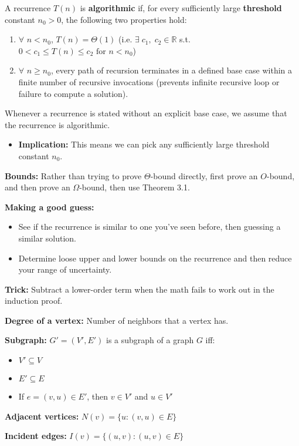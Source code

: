 A recurrence $T(n)$ is \textbf{algorithmic} if, for every sufficiently large \textbf{threshold} constant $n_0 >0$, the following two properties hold:
\begin{enumerate}
    \item $\forall$ $n<n_0$, $T(n) = \Theta(1)$ (i.e. $\exists \; c_1, \; c_2 \in \mathbb{R}$ s.t. $0<c_1\leq T(n) \leq c_2 \text{ for } n<n_0$)
    \item $\forall$ $n \geq n_0$, every path of recursion terminates in a defined base case within a finite number of recursive invocations (prevents infinite recursive loop or failure to compute a solution).
\end{enumerate}

\begin{intuition}
    Whenever a recurrence is stated without an explicit base case, we assume that the recurrence is algorithmic.
    \begin{itemize}
        \item \textbf{Implication:} This means we can pick any sufficiently large threshold constant $n_0$.
    \end{itemize}
\end{intuition}

\item \textbf{Bounds:} Rather than trying to prove $\Theta$-bound directly, first prove an $O$-bound, and then prove an $\Omega$-bound, then use Theorem 3.1.
            \item \textbf{Making a good guess:}
            \begin{itemize}
                \item See if the recurrence is similar to one you've seen before, then guessing a similar solution.
                \item Determine loose upper and lower bounds on the recurrence and then reduce your range of uncertainty.
            \end{itemize}
            \item \textbf{Trick:} Subtract a lower-order term when the math fails to work out in the induction proof.
            
\item \textbf{Degree of a vertex:} Number of neighbors that a vertex has.
\item 
\item \textbf{Subgraph:} $G' = (V', E')$ is a subgraph of a graph $G$ iff:
\begin{itemize}
    \item $V' \subseteq V$
    \item $E' \subseteq E$
    \item If $e = (v, u) \in E'$, then $v \in V'$ and $u \in V'$
\end{itemize}
\item \textbf{Adjacent vertices:} $N(v) = \{u : (v, u) \in E\}$
\item \textbf{Incident edges:} $I(v) = \{(u, v) : (u, v) \in E\}$

